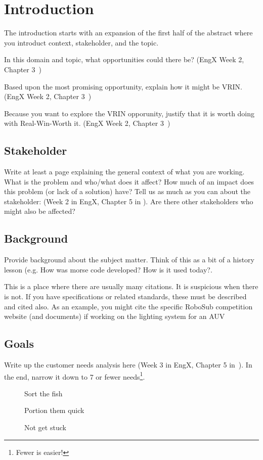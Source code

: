 \chapter{Introduction\label{cha:introduction}}

The introduction starts with an expansion of the first half of the abstract where you introduct context, stakeholder, and the topic.

In this domain and topic, what opportunities could there be?  (EngX Week 2, Chapter 3~\cite{ulrich2020product-design-development})

Based upon the most promising opportunity, explain how it might be VRIN. (EngX Week 2, Chapter 3~\cite{ulrich2020product-design-development})

Because you want to explore the VRIN opporunity, justify that it is worth doing with Real-Win-Worth it. (EngX Week 2, Chapter 3~\cite{ulrich2020product-design-development})

\section{Stakeholder}
Write at least a page explaining the general context of what you are working.
What is the problem and who/what does it affect?
How much of an impact does this problem (or lack of a solution) have?
Tell us as much as you can about the stakeholder: (Week 2 in EngX, Chapter 5 in \cite{ulrich2020product-design-development}).
Are there other stakeholders who might also be affected?

\section{Background}
Provide background about the subject matter.
Think of this as a bit of a history lesson (e.g. How was morse code
developed?  How is it used today?.

This is a place where there are usually many citations.
It is suspicious when there is not.
If you have specifications or related standards, these must be
described and cited also.
As an example, you might cite the specific
RoboSub competition website (and documents) if working on the lighting system for an AUV\cite{guls2016auvlight}

\section{Goals}
Write up the customer needs analysis here (Week 3 in EngX, Chapter 5 in~\cite{ulrich2020product-design-development}).
In the end, narrow it down to 7 or fewer needs\footnote{Fewer is easier!}. 
\begin{description}
  \item[]  Sort the fish
  \item[]
    Portion them quick
  \item[]  Not get stuck
\end{description}

